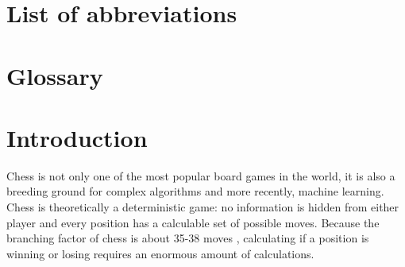 \documentclass{article}
\begin{document}
\section*{List of abbreviations}



\newpage
\section*{Glossary}

\newpage
\setcounter{section}{0}
\section{Introduction}


Chess is not only one of the most popular board games in the world, it is also a breeding ground for
complex algorithms and more recently, machine learning. Chess is theoretically a deterministic game: 
no information is hidden from either player and every position has a calculable set of possible moves.
Because the branching factor of chess is about 35-38 moves \cite{BranchingFactorChessprogramming}, 
calculating if a position is winning or losing requires an enormous amount of calculations.
\end{document}
